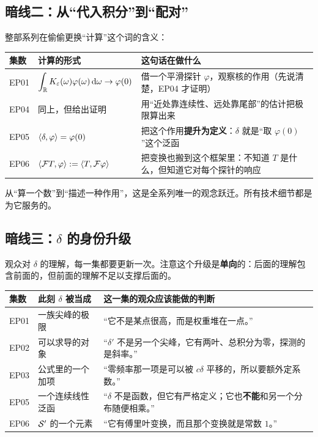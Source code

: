 \subsection*{暗线二：从“代入积分”到“配对”}

整部系列在偷偷更换“计算”这个词的含义：

\begin{center}
\small
\renewcommand{\arraystretch}{1.4}
\begin{tabularx}{\textwidth}{@{}L{1.5cm}L{4.4cm}L{9.0cm}@{}}
\toprule
集数 & 计算的形式 & 这句话在做什么 \\
\midrule
EP01 & $\displaystyle\int_{\mathbb{R}}K_{\varepsilon}(\omega)\varphi(\omega)\mathop{}\!\mathrm{d}\omega\to\varphi(0)$ & 借一个平滑探针 $\varphi$，观察核的作用（先说清楚，EP04 才证明）\\
EP04 & 同上，但给出证明 & 用“近处靠连续性、远处靠尾部”的估计把极限算出来 \\
EP05 & $\langle \delta,\varphi\rangle=\varphi(0)$ & 把这个作用\textbf{提升为定义}：$\delta$ 就是“取 $\varphi(0)$”这个泛函 \\
EP06 & $\langle \mathcal{F} T,\varphi\rangle:=\langle T,\mathcal{F}\varphi\rangle$ & 把变换也搬到这个框架里：不知道 $T$ 是什么，但知道它对每个探针的响应 \\
\bottomrule
\end{tabularx}
\end{center}

从“算一个数”到“描述一种作用”，这是全系列唯一的观念跃迁。所有技术细节都是为它服务的。

\subsection*{暗线三：$\delta$ 的身份升级}

观众对 $\delta$ 的理解，每一集都要更新一次。注意这个升级是\textbf{单向}的：后面的理解包含前面的，但前面的理解不足以支撑后面的。

\begin{center}
\small
\renewcommand{\arraystretch}{1.4}
\begin{tabularx}{\textwidth}{@{}L{1.3cm}L{4.2cm}L{9.4cm}@{}}
\toprule
集数 & 此刻 $\delta$ 被当成 & 这一集的观众应该能做的判断 \\
\midrule
EP01 & 一族尖峰的极限 & “它不是某点很高，而是权重堆在一点。”\\
EP02 & 可以求导的对象 & “$\delta'$ 不是另一个尖峰，它有两叶、总积分为零，探测的是斜率。”\\
EP03 & 公式里的一个加项 & “零频率那一项是可以被 $c\delta$ 平移的，所以要额外定系数。”\\
EP05 & 一个连续线性泛函 & “$\delta$ 不是函数，但它有严格定义；它也\textbf{不能}和另一个分布随便相乘。”\\
EP06 & $\mathcal{S}'$ 的一个元素 & “它有傅里叶变换，而且那个变换就是常数 $1$。”\\
\bottomrule
\end{tabularx}
\end{center}

